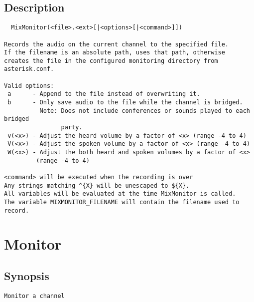 \subsection{Description}
\begin{verbatim}
  MixMonitor(<file>.<ext>[|<options>[|<command>]])

Records the audio on the current channel to the specified file.
If the filename is an absolute path, uses that path, otherwise
creates the file in the configured monitoring directory from
asterisk.conf.

Valid options:
 a      - Append to the file instead of overwriting it.
 b      - Only save audio to the file while the channel is bridged.
          Note: Does not include conferences or sounds played to each bridged
                party.
 v(<x>) - Adjust the heard volume by a factor of <x> (range -4 to 4)
 V(<x>) - Adjust the spoken volume by a factor of <x> (range -4 to 4)
 W(<x>) - Adjust the both heard and spoken volumes by a factor of <x>
         (range -4 to 4)

<command> will be executed when the recording is over
Any strings matching ^{X} will be unescaped to ${X}.
All variables will be evaluated at the time MixMonitor is called.
The variable MIXMONITOR_FILENAME will contain the filename used to record.

\end{verbatim}


\section{Monitor}
\subsection{Synopsis}
\begin{verbatim}
Monitor a channel
\end{verbatim}
